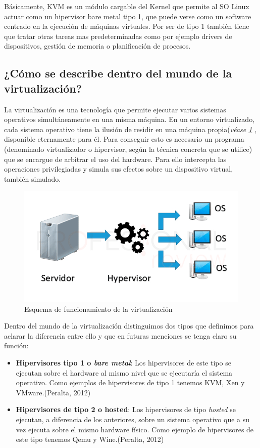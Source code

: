 \documentclass[11pt]{article}
\begin{document}
Básicamente, KVM es un módulo cargable del Kernel que permite al SO Linux actuar como un hipervisor bare metal tipo 1, que puede verse como un software centrado en la ejecución de máquinas virtuales. Por ser de tipo 1 también tiene que tratar otras tareas mas predeterminadas como por ejemplo drivers de dispositivos, gestión de memoria o planificación de procesos.


\subsection{¿Cómo se describe dentro del mundo de la virtualización?}
La virtualización es una tecnología que permite ejecutar varios sistemas operativos simultáneamente en una misma máquina. En un entorno virtualizado, cada sistema operativo tiene la ilusión de residir en una máquina propia(\textit{véase \ref{Funcionamiento} }, disponible eternamente para él.  Para conseguir esto es necesario un programa (denominado virtualizador o hipervisor, según la técnica concreta que se utilice) que se encargue de arbitrar el uso del hardware. Para ello intercepta las operaciones privilegiadas y simula sus efectos sobre un dispositivo virtual, también simulado. \\

\begin{figure}
\centering
\caption{Esquema de funcionamiento de la virtualización}
\label{Funcionamiento}
\includegraphics[width=1\textwidth, scale=1]{virtualizacion-tuto02.png}
\end{figure}

Dentro del mundo de la virtualización distinguimos dos tipos que definimos para aclarar la diferencia entre ello y que en futuras menciones se tenga claro su función:

\begin{itemize}
\item \textbf{Hipervisores tipo 1 o \textit{bare metal}}: Los hipervisores de este tipo se ejecutan sobre el hardware al mismo nivel que se ejecutaría el sistema operativo. Como ejemplos de hipervisores de tipo 1 tenemos KVM, Xen y VMware.(Peralta, 2012)
\item \textbf{Hipervisores de tipo 2 o \textbf{hosted}}: Los hipervisores de tipo \textit{hosted} se ejecutan, a diferencia de los anteriores, sobre un sistema operativo que a su vez ejecuta sobre el mismo hardware físico. Como ejemplo de hipervisores de este tipo tenemos Qemu y Wine.(Peralta, 2012)
\end{itemize}
\end{document}

